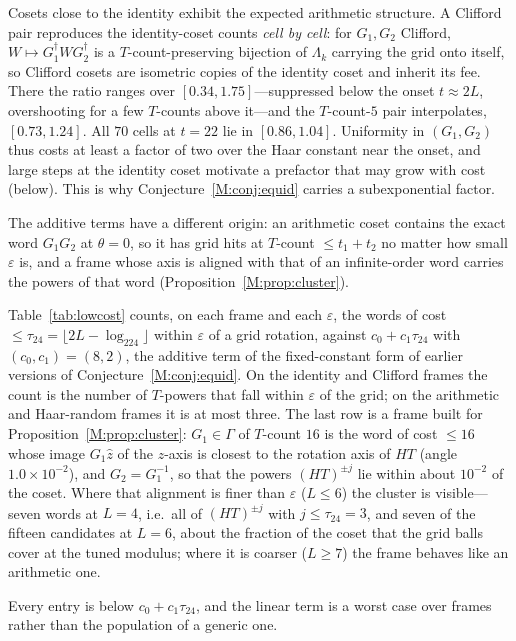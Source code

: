 \documentclass[aps,prx,twocolumn,superscriptaddress,nofootinbib,longbibliography]{revtex4-2}
\theoremstyle{plain}
\theoremstyle{definition}
\theoremstyle{remark}
\begin{document}
Cosets close to the identity exhibit the expected arithmetic structure. A Clifford pair reproduces the identity-coset counts \emph{cell by cell}: for $G_1,G_2$ Clifford, $W\mapsto G_1^\dagger WG_2^\dagger$ is a $T$-count-preserving bijection of $\Lambda_k$ carrying the grid onto itself, so Clifford cosets are isometric copies of the identity coset and inherit its fee. There the ratio ranges over $[0.34,1.75]$---suppressed below the onset $t\approx2L$, overshooting for a few $T$-counts above it---and the $T$-count-$5$ pair interpolates, $[0.73,1.24]$. All $70$ cells at $t=22$ lie in $[0.86,1.04]$. Uniformity in $(G_1,G_2)$ thus costs at least a factor of two over the Haar constant near the onset, and large steps at the identity coset motivate a prefactor that may grow with cost (below). This is why Conjecture~\ref{M:conj:equid} carries a subexponential factor. 

The additive terms have a different origin: an arithmetic coset contains the exact word $G_1G_2$ at $\theta=0$, so it has grid hits at $T$-count $\le t_1+t_2$ no matter how small $\varepsilon$ is, and a frame whose axis is aligned with that of an infinite-order word carries the powers of that word (Proposition~\ref{M:prop:cluster}). 

Table~\ref{tab:lowcost} counts, on each frame and each $\varepsilon$, the words of cost $\le\tau_{24}=\lfloor2L-\log_224\rfloor$ within $\varepsilon$ of a grid rotation, against $c_0+c_1\tau_{24}$ with $(c_0,c_1)=(8,2)$, the additive term of the fixed-constant form of earlier versions of Conjecture~\ref{M:conj:equid}. On the identity and Clifford frames the count is the number of $T$-powers that fall within $\varepsilon$ of the grid; on the arithmetic and Haar-random frames it is at most three. The last row is a frame built for Proposition~\ref{M:prop:cluster}: $G_1\in\Gamma$ of $T$-count $16$ is the word of cost $\le16$ whose image $G_1\hat z$ of the $z$-axis is closest to the rotation axis of $HT$ (angle $1.0\times10^{-2}$), and $G_2=G_1^{-1}$, so that the powers $(HT)^{\pm j}$ lie within about $10^{-2}$ of the coset. Where that alignment is finer than $\varepsilon$ ($L\le6$) the cluster is visible---seven words at $L=4$, i.e.\ all of $(HT)^{\pm j}$ with $j\le\tau_{24}=3$, and seven of the fifteen candidates at $L=6$, about the fraction of the coset that the grid balls cover at the tuned modulus; where it is coarser ($L\ge7$) the frame behaves like an arithmetic one. 

Every entry is below $c_0+c_1\tau_{24}$, and the linear term is a worst case over frames rather than the population of a generic one. 
\end{document}
